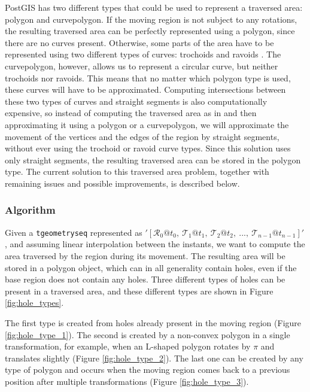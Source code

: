 PostGIS has two different types that could be used to represent a traversed area: polygon and curvepolygon. If the moving region is not subject to any rotations, the resulting traversed area can be perfectly represented using a polygon, since there are no curves present. Otherwise, some parts of the area have to be represented using two different types of curves: trochoids and ravoids \cite{fmregion}. The curvepolygon, however, allows us to represent a circular curve, but neither trochoids nor ravoids. This means that no matter which polygon type is used, these curves will have to be approximated. Computing intersections between these two types of curves and straight segments is also computationally expensive, so instead of computing the traversed area as in \cite{fmregion} and then approximating it using a polygon or a curvepolygon, we will approximate the movement of the vertices and the edges of the region by straight segments, without ever using the trochoid or ravoid curve types. Since this solution uses only straight segments, the resulting traversed area can be stored in the polygon type. The current solution to this traversed area problem, together with remaining issues and possible improvements, is described below.

\subsubsection{Algorithm}

Given a \lstinline+tgeometryseq+ represented as $'[\mathcal{R}_0@t_0,\ \mathcal{T}_1@t_1,\ \mathcal{T}_2@t_2,\ ..., \ \mathcal{T}_{n-1}@t_{n-1}]'$, and assuming linear interpolation between the instants, we want to compute the area traversed by the region during its movement. The resulting area will be stored in a polygon object, which can in all generality contain holes, even if the base region does not contain any holes. Three different types of holes can be present in a traversed area, and these different types are shown in Figure \ref{fig:hole_types}. 

The first type is created from holes already present in the moving region (Figure \ref{fig:hole_type_1}). The second is created by a non-convex polygon in a single transformation, for example, when an L-shaped polygon rotates by $\pi$ and translates slightly (Figure \ref{fig:hole_type_2}). The last one can be created by any type of polygon and occurs when the moving region comes back to a previous position after multiple transformations (Figure \ref{fig:hole_type_3}).

